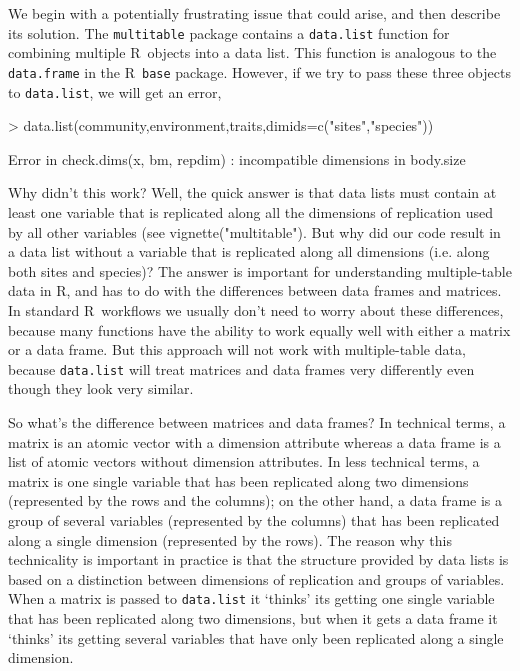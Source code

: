 \documentclass{article}
\newcommand{\R}{{\sf R}}
\newcommand{\code}[1]{\texttt{#1}}
\numberwithin{exercise}{section}
\begin{document}
We begin with a potentially frustrating issue that could arise, and then describe its solution.  The \code{multitable} package contains a \code{data.list} function for combining multiple \R\ objects into a data list.  This function is analogous to the \code{data.frame} in the \R\ \code{base} package.  However, if we try to pass these three objects to \code{data.list}, we will get an error,
\begin{Schunk}
\begin{Sinput}
> data.list(community,environment,traits,dimids=c("sites","species"))
\end{Sinput}
\end{Schunk}
\begin{Schunk}
\begin{Soutput}
Error in check.dims(x, bm, repdim) : incompatible dimensions in body.size
\end{Soutput}
\end{Schunk}

Why didn't this work?  Well, the quick answer is that data lists must contain at least one variable that is replicated along all the dimensions of replication used by all other variables (see vignette("multitable").  But why did our code result in a data list without a variable that is replicated along all dimensions (i.e. along both sites and species)?  The answer is important for understanding multiple-table data in \R, and has to do with the differences between data frames and matrices.  In standard \R\ workflows we usually don't need to worry about these differences, because many functions have the ability to work equally well with either a matrix or a data frame.  But this approach will not work with multiple-table data, because \code{data.list} will treat matrices and data frames very differently even though they look very similar.

So what's the difference between matrices and data frames?  In technical terms, a matrix is an atomic vector with a dimension attribute whereas a data frame is a list of atomic vectors without dimension attributes.  In less technical terms, a matrix is one single variable that has been replicated along two dimensions (represented by the rows and the columns); on the other hand, a data frame is a group of several variables (represented by the columns) that has been replicated along a single dimension (represented by the rows).  The reason why this technicality is important in practice is that the structure provided by data lists is based on a distinction between dimensions of replication and groups of variables.  When a matrix is passed to \code{data.list} it `thinks' its getting one single variable that has been replicated along two dimensions, but when it gets a data frame it `thinks' its getting several variables that have only been replicated along a single dimension.
\end{document}
